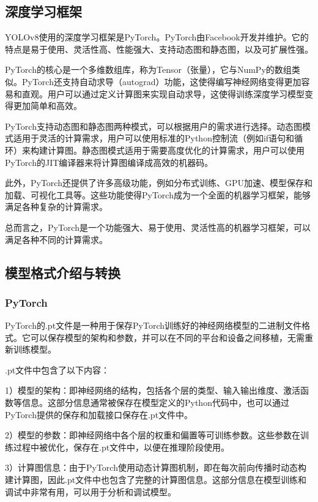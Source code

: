 \documentclass{ctexart}
\numberwithin{equation}{section}%
\numberwithin{figure}{section}%
\numberwithin{table}{section}%
\begin{document}
	\subsection{深度学习框架}
	YOLOv8使用的深度学习框架是PyTorch。PyTorch由Facebook开发并维护。它的特点是易于使用、灵活性高、性能强大、支持动态图和静态图，以及可扩展性强。
	
	PyTorch的核心是一个多维数组库，称为Tensor（张量），它与NumPy的数组类似。PyTorch还支持自动求导（autograd）功能，这使得编写神经网络变得更加容易和直观。用户可以通过定义计算图来实现自动求导，这使得训练深度学习模型变得更加简单和高效。
	
	PyTorch支持动态图和静态图两种模式，可以根据用户的需求进行选择。动态图模式适用于灵活的计算需求，用户可以使用标准的Python控制流（例如if语句和循环）来构建计算图。静态图模式适用于需要高度优化的计算需求，用户可以使用PyTorch的JIT编译器来将计算图编译成高效的机器码。
	
	此外，PyTorch还提供了许多高级功能，例如分布式训练、GPU加速、模型保存和加载、可视化工具等。这些功能使得PyTorch成为一个全面的机器学习框架，能够满足各种复杂的计算需求。
	
	总而言之，PyTorch是一个功能强大、易于使用、灵活性高的机器学习框架，可以满足各种不同的计算需求。

	\subsection{模型格式介绍与转换}
	\subsubsection{PyTorch}
	PyTorch的.pt文件是一种用于保存PyTorch训练好的神经网络模型的二进制文件格式。它可以保存模型的架构和参数，并可以在不同的平台和设备之间移植，无需重新训练模型。
	
	.pt文件中包含了以下内容：
	
	1）模型的架构：即神经网络的结构，包括各个层的类型、输入输出维度、激活函数等信息。这部分信息通常被保存在模型定义的Python代码中，也可以通过PyTorch提供的保存和加载接口保存在.pt文件中。
	
	2）模型的参数：即神经网络中各个层的权重和偏置等可训练参数。这些参数在训练过程中被优化，保存在.pt文件中，以便在推理阶段使用。
	
	3）计算图信息：由于PyTorch使用动态计算图机制，即在每次前向传播时动态构建计算图，因此.pt文件中也包含了完整的计算图信息。这部分信息在模型训练和调试中非常有用，可以用于分析和调试模型。
	
%	
%	
%	
%	
	
\end{document}
